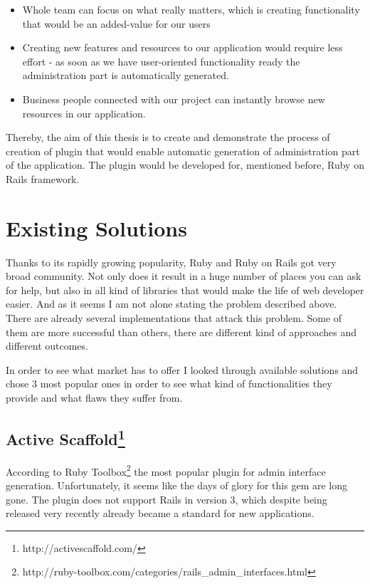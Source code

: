   \begin{itemize}
	  \item Whole team can focus on what really matters, which is creating functionality that would be an added-value for our users
	  \item Creating new features and resources to our application would require less effort - as soon as we have user-oriented functionality ready the administration part is automatically generated.
	  \item Business people connected with our project can instantly browse new resources in our application.
	\end{itemize}
  
  Thereby, the aim of this thesis is to create and demonstrate the process of creation of plugin that would enable automatic generation of administration part of the application. The plugin would be developed for, mentioned before, Ruby on Rails framework.
  
  \section{Existing Solutions}
  Thanks to its rapidly growing popularity, Ruby and Ruby on Rails got very broad community. Not only does it result in a huge number of places you can ask for help, but also in all kind of libraries that would make the life of web developer easier. And as it seems I am not alone stating the problem described above. There are already several implementations that attack this problem. Some of them are more successful than others, there are different kind of approaches and different outcomes. 
  
  In order to see what market has to offer I looked through available solutions and chose 3 most popular ones in order to see what kind of functionalities they provide and what flaws they suffer from. 
  
    \subsection[Active Scaffold] {Active Scaffold\footnote{http://activescaffold.com/}}
      According to Ruby Toolbox\footnote{http://ruby-toolbox.com/categories/rails\_admin\_interfaces.html} the most popular plugin for admin interface generation. Unfortunately, it seems like the days of glory for this gem are long gone. The plugin does not support Rails in version 3, which despite being released very recently already became a standard for new applications. 
      
